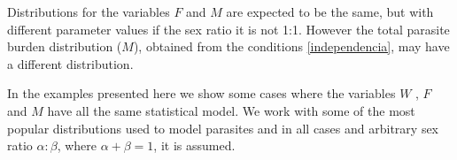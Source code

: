\documentclass[bimj,fleqn]{w-art}
\theoremstyle{plain}
\theoremstyle{definition}
\begin{document}
Distributions for the variables $F$ and $M$ are expected to be the same, but with different parameter values if the sex ratio it is not 1:1. However the total parasite burden distribution ($M$), obtained from the conditions \eqref{independencia}, may have a different distribution. 



In the examples presented here we show some cases where the variables $W$ , $F$ and $M$ have all the same statistical model.
We work with some of the most popular distributions	used to model parasites and in all cases and arbitrary sex ratio $\alpha:\beta$, where $\alpha+\beta=1$, it is assumed. 

\end{document}
